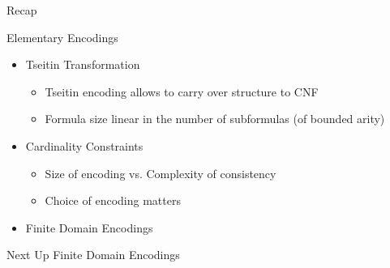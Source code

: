 \documentclass[t]{sdqbeamer}
\begin{document}
\begin{frame}{Recap}

	\begin{block}{Elementary Encodings}
		\begin{itemize}\setlength{\itemsep}{1em}
			\item Tseitin Transformation
			\begin{itemize}\setlength{\itemsep}{1ex}
				\item Tseitin encoding allows to carry over structure to CNF
				\item Formula size linear in the number of subformulas (of bounded arity)
			\end{itemize}
			\item Cardinality Constraints
			\begin{itemize}\setlength{\itemsep}{1ex}
				\item Size of encoding vs. Complexity of consistency
				\item Choice of encoding matters
			\end{itemize}
			\item Finite Domain Encodings
		\end{itemize}
	\end{block}
	\pause
	\begin{block}{Next Up}
		Finite Domain Encodings
	\end{block}
	
\end{frame}
\end{document}
